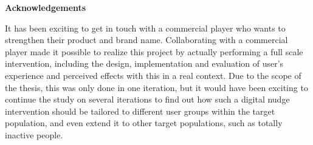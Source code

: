 \vspace*{\fill}

\vspace{1cm}
\begin{flushleft}

\large
\textbf{Acknowledgements}








It has been exciting to get in touch with a commercial player who wants to strengthen their product and brand name. Collaborating with a commercial player made it possible to realize this project by actually performing a full scale intervention, including the design, implementation and evaluation of user's experience and perceived effects with this in a real context. Due to the scope of the thesis, this was only done in one iteration, but it would have been exciting to continue the study on several iterations to find out how such a digital nudge intervention should be tailored to different user groups within the target population, and even extend it to other target populations, such as totally inactive people. 


\end{flushleft}
